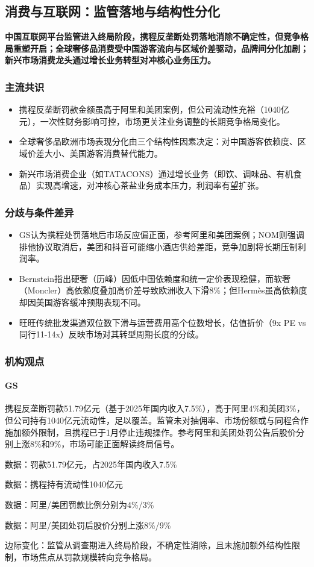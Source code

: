 \documentclass[11pt]{ctexart}
\begin{document}
\subsection{消费与互联网：监管落地与结构性分化}
\textbf{中国互联网平台监管进入终局阶段，携程反垄断处罚落地消除不确定性，但竞争格局重塑开启；全球奢侈品消费受中国游客流向与区域价差驱动，品牌间分化加剧；新兴市场消费龙头通过增长业务转型对冲核心业务压力。}
\subsubsection*{主流共识}
\begin{itemize}
  \item 携程反垄断罚款金额虽高于阿里和美团案例，但公司流动性充裕（1040亿元），一次性财务影响可控，市场更关注业务调整的长期竞争格局变化。
  \item 全球奢侈品欧洲市场表现分化由三个结构性因素决定：对中国游客依赖度、区域价差大小、美国游客消费替代能力。
  \item 新兴市场消费企业（如TATACONS）通过增长业务（即饮、调味品、有机食品）实现高增速，对冲核心茶盐业务成本压力，利润率有望扩张。
\end{itemize}
\subsubsection*{分歧与条件差异}
\begin{itemize}
  \item GS认为携程处罚落地后市场反应偏正面，参考阿里和美团案例；NOM则强调排他协议取消后，美团和抖音可能缩小酒店供给差距，竞争加剧将长期压制利润率。
  \item Bernstein指出硬奢（历峰）因低中国依赖度和统一定价表现稳健，而软奢（Moncler）高依赖度叠加高价差导致欧洲收入下滑8\%；但Hermès虽高依赖度却因美国游客缓冲预期表现不同。
  \item 旺旺传统批发渠道双位数下滑与运营费用高个位数增长，估值折价（9x PE vs 同行11-14x）反映市场对其转型周期长度的分歧。
\end{itemize}
\subsubsection*{机构观点}
\paragraph{GS} 携程反垄断罚款51.79亿元（基于2025年国内收入7.5\%），高于阿里4\%和美团3\%，但公司持有1040亿元流动性，足以覆盖。监管未对抽佣率、市场份额或与同程合作施加额外限制，且携程已于1月停止违规操作。参考阿里和美团处罚公告后股价分别上涨8\%和9\%，市场可能正面解读终局信号。
{\small\color{refgray}数据：罚款51.79亿元，占2025年国内收入7.5\%\par}
{\small\color{refgray}数据：携程持有流动性1040亿元\par}
{\small\color{refgray}数据：阿里/美团罚款比例分别为4\%/3\%\par}
{\small\color{refgray}数据：阿里/美团处罚后股价分别上涨8\%/9\%\par}
{\small\color{refgray}边际变化：监管从调查期进入终局阶段，不确定性消除，且未施加额外结构性限制，市场焦点从罚款规模转向竞争格局。\par}
\end{document}
